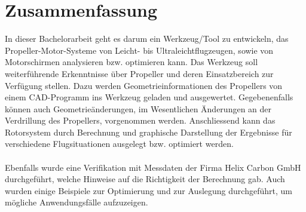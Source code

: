 \section*{Zusammenfassung}
\label{sec:zusammenfassung}


In dieser Bachelorarbeit geht es darum ein Werkzeug/Tool zu entwickeln, das Propeller-Motor-Systeme von Leicht- bis Ultraleichtflugzeugen, sowie von Motorschirmen analysieren bzw. optimieren kann. Das Werkzeug soll weiterführende Erkenntnisse über Propeller und deren Einsatzbereich zur Verfügung stellen. Dazu werden Geometrieinformationen des Propellers von einem CAD-Programm ins Werkzeug geladen und ausgewertet. Gegebenenfalls können auch Geometrieänderungen, im Wesentlichen Änderungen an der Verdrillung des Propellers, vorgenommen werden. Anschliessend kann das Rotorsystem durch Berechnung und graphische Darstellung der Ergebnisse für verschiedene Flugsituationen ausgelegt bzw. optimiert werden. 
\\
\\
Ebenfalls wurde eine Verifikation mit Messdaten der Firma Helix Carbon GmbH durchgeführt, welche Hinweise auf die Richtigkeit der Berechnung gab. Auch wurden einige Beispiele zur Optimierung und zur Auslegung durchgeführt, um mögliche Anwendungsfälle aufzuzeigen.
